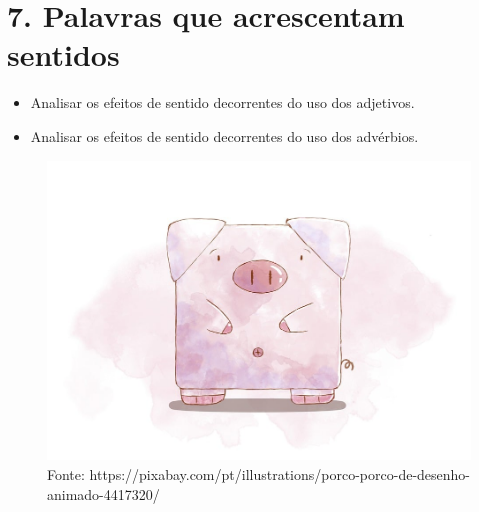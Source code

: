 \chapter{7. Palavras que acrescentam sentidos}



\begin{itemize}
\item Analisar os efeitos de sentido decorrentes do uso dos adjetivos.

\item Analisar os efeitos de sentido decorrentes do uso dos advérbios.
\end{itemize}

\begin{figure}[htpb!]
\includegraphics[width=.5\textwidth]{./imgs/img20.jpg}
\caption{Fonte: https://pixabay.com/pt/illustrations/porco-porco-de-desenho-animado-4417320/}
\end{figure}


